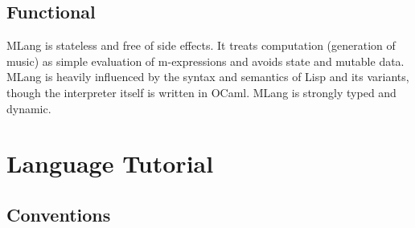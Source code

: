 \documentclass[letterpaper,11pt]{article}
\begin{document}
\subsection{Functional}
MLang is stateless and free of side effects. It treats computation (generation of music) as simple evaluation of m-expressions and avoids state and mutable data. MLang is heavily influenced by the syntax and semantics of Lisp and its variants, though the interpreter itself is written in OCaml. MLang is strongly typed and dynamic.


\section{Language Tutorial}

\subsection{Conventions}
\end{document}
